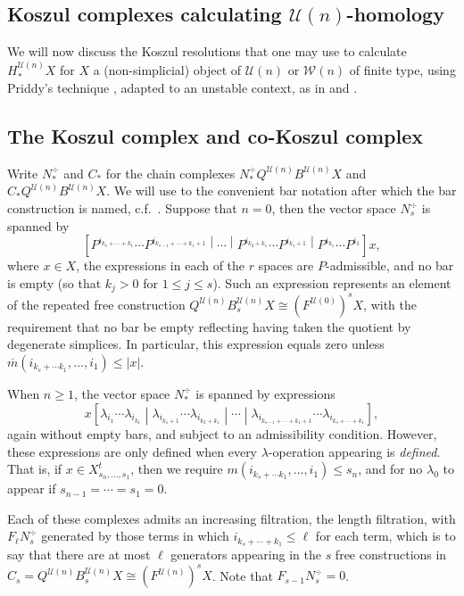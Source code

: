 \documentclass[11pt]{amsart} \renewcommand{\baselinestretch}{1.2}
\theoremstyle{plain}
\numberwithin{equation}{section} %
\theoremstyle{plain}
\numberwithin{equation}{chapter} %
\newcommand{\calU}{\mathcal{U}}
\newcommand{\calw}{\mathcal{W}}
\newcommand{\citeBOX}[2][]{\cite[\mbox{#1}]{#2}}
\newcommand{\minDimP}{\overline{m}}
\newcommand{\minDimDelta}{m}
\newcommand{\SectionOrChapter}[1]{\section{\textbf{#1}}}
\newcommand{\SubsectionOrSection}[1]{\subsection{#1}}
\begin{document}
\begin{Koszul complexes}

\SectionOrChapter{Koszul complexes calculating $\calU(n)$-homology}
\label{Koszul Cx section}\label{Koszul complexes}
We will now discuss the Koszul resolutions that one may use to calculate $H_*^{\calU(n)}X$ for $X$ a (non-simplicial)  object of $\calU(n)$ or $\calw(n)$ of finite type, using Priddy's technique \cite{PriddyKoszul.pdf}, adapted to an unstable context, as in \cite{CurtisSimplicialHtpy.pdf} and \cite[Chapter V]{MR1089001}.

\SubsectionOrSection{The Koszul complex and co-Koszul complex}
\label{The Koszul complex and co-Koszul complex}
Write $N_*^\div $ and $C_*$ for the chain complexes $N_*^\div Q^{\calU(n)}B^{\calU(n)}X$ and $C_* Q^{\calU(n)}B^{\calU(n)}X$.  We will use to the convenient bar notation after which the bar construction is named, c.f.\ \citeBOX[\S7]{grpsHPin.pdf}. Suppose that $n=0$, then the vector space  $N_s^\div$ is spanned by
\[\left[P^{i_{k_s+\cdots +k_1}}\cdots P^{i_{k_{s-1}+\cdots +k_1+1}}
\middle|\cdots 
\middle|P^{i_{k_2+k_1}}\cdots P^{i_{k_1+1}}
\middle|P^{i_{k_1}}\cdots P^{i_1}\right]
x,\]
where $x\in X$, the expressions in each of the $r$ spaces are $P$-admissible, and no bar is empty (so that $k_j>0$ for $1\leq j\leq s$). Such an expression represents an element of the repeated free construction $Q^{\calU(n)}B^{\calU(n)}_sX\cong (F^{\calU(0)})^{s}X$, with the requirement that no bar be empty reflecting having taken the quotient by degenerate simplices. In particular, this expression equals zero unless $\minDimP(i_{k_s+\cdots k_1},\ldots,i_1)\leq |x|$.

When $n\geq1$, the vector space $N_*^\div$ is spanned by expressions \[x\left[\lambda_{i_1}\cdots \lambda_{i_{k_1}} 
\middle|\lambda_{i_{k_1+1}}\cdots \lambda_{i_{k_2+k_1}}
\middle|\cdots\middle|\lambda_{i_{k_{s-1}+\cdots +k_1+1}}\cdots \lambda_{i_{k_s+\cdots +k_1}}\right],
\]
again without empty bars, and subject to an admissibility condition. However, these expressions are only defined when every $\lambda$-operation appearing is \emph{defined}. That is, if $x\in X^{t}_{s_n,\ldots,s_1}$, then we require $\minDimDelta(i_{k_s+\cdots k_1},\ldots,i_1)\leq s_n$, and for no $\lambda_0$ to appear if $s_{n-1}=\cdots =s_1=0$.

Each of these complexes admits an increasing filtration, the length filtration, with $F_\ell N^\div_s$ generated by those terms in which $i_{k_s+\cdots +k_1}\leq \ell$ for each term, which is to say that there are at most $\ell$ generators appearing in the $s$ free constructions in $C_s= Q^{\calU(n)}B^{\calU(n)}_sX\cong (F^{\calU(n)})^sX$. Note that $F_{s-1}N^\div_s=0$. %


\end{Koszul complexes}
\end{document}
